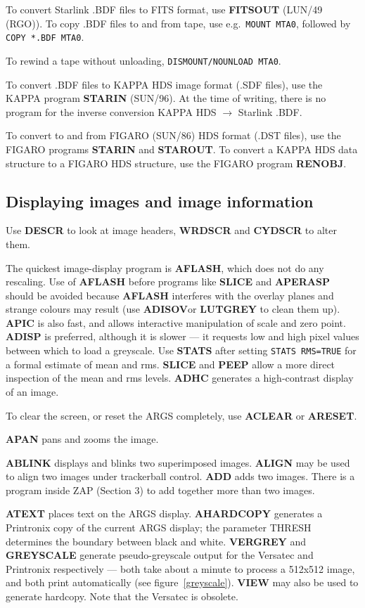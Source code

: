 To convert Starlink .BDF files to FITS format, use {\bf FITSOUT}
(LUN/49 (RGO)).
To copy .BDF files to and from tape, use e.g.\ {\tt MOUNT MTA0}, followed by
{\tt COPY *.BDF MTA0}.

To rewind a tape without unloading, {\tt DISMOUNT/NOUNLOAD MTA0}.

To convert .BDF files to KAPPA HDS image format (.SDF files), use the KAPPA program {\bf STARIN} (SUN/96).
At the time of writing, there is no program for the inverse
conversion KAPPA HDS 
$\rightarrow$
Starlink .BDF.

To convert to and from FIGARO (SUN/86) HDS format (.DST files),
use the FIGARO programs {\bf STARIN} and {\bf STAROUT}.
To convert a KAPPA HDS data structure to a
FIGARO HDS structure, use
the FIGARO program {\bf RENOBJ}.

\subsection {Displaying images and image information}

Use {\bf DESCR} to look at image headers, {\bf WRDSCR} and {\bf CYDSCR} to
alter them.

The quickest image-display program is {\bf AFLASH}, which does not do any
rescaling.
Use of {\bf AFLASH} before programs like {\bf SLICE} and {\bf APERASP} should be
avoided because {\bf AFLASH} interferes with the overlay planes and strange
colours may result (use {\bf ADISOV}or {\bf LUTGREY} to clean them up).
{\bf APIC} is also fast, and allows interactive manipulation of scale and zero
point.
{\bf ADISP} is preferred, although it is slower --- it requests low
and high pixel values between which to load a greyscale.
Use {\bf STATS} after setting {\tt STATS RMS=TRUE} for a formal estimate of
mean and rms.
{\bf SLICE} and {\bf PEEP} allow a more direct inspection of the mean and rms
levels.
{\bf ADHC} generates a high-contrast display of an image.

To clear the screen, or reset the ARGS completely, use {\bf ACLEAR} or
{\bf ARESET}.

{\bf APAN} pans and zooms the image.

{\bf ABLINK} displays and blinks two superimposed images.
{\bf ALIGN} may be used to align two images under trackerball control.
{\bf ADD} adds two images.
There is a program inside ZAP (Section 3) to add together more than two images.

{\bf ATEXT} places text on the ARGS display.
{\bf AHARDCOPY} generates a Printronix copy of the current ARGS display; the
parameter THRESH determines the boundary between black and white.
{\bf VERGREY} and {\bf GREYSCALE} generate pseudo-greyscale output for the
Versatec and Printronix respectively --- both take about a minute to process a
512x512 image, and both print automatically (see figure~\ref{greyscale}).
{\bf VIEW} may also be used to generate hardcopy.
Note that the Versatec is obsolete.


